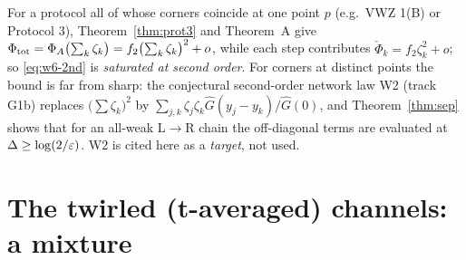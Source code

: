 \documentclass[11pt]{article}
\theoremstyle{definition}\newtheorem{example}[theorem]{Example}
\begin{document}
\begin{remark}\label{rem:w6-sat}
For a protocol all of whose corners coincide at one point $p$ (e.g.\ VWZ 1(B) or Protocol 3),
Theorem~\ref{thm:prot3} and Theorem~A give $\Phi_{\rm tot}=\Phi_A\bigl(\sum_k\zeta_k\bigr)
=f_2\bigl(\sum_k\zeta_k\bigr)^2+o$, while each step contributes $\check\Phi_k=f_2\zeta_k^2+o$;
so \eqref{eq:w6-2nd} is \emph{saturated at second order}.  For corners at distinct points the
bound is far from sharp: the conjectural second-order network law W2 (track G1b) replaces
$\bigl(\sum\zeta_k\bigr)^2$ by $\sum_{j,k}\zeta_j\zeta_k\hat G(y_j-y_k)/\hat G(0)$, and
Theorem~\ref{thm:sep} shows that for an all-weak L$\to$R chain the off-diagonal terms are
evaluated at $\Delta\ge\log(2/\varepsilon)$.  W2 is cited here as a \emph{target}, not used.
\end{remark}

\section{The twirled (t-averaged) channels: a mixture}\label{sec:twirl}
\end{document}
